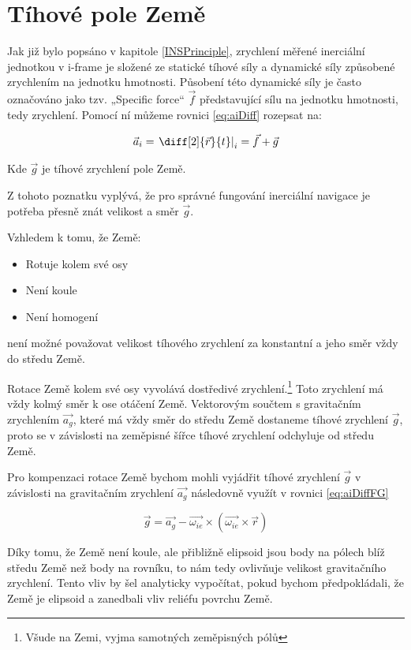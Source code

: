 \section{Tíhové pole Země}
Jak již bylo popsáno v kapitole \ref{INSPrinciple}, zrychlení měřené inerciální jednotkou v i-frame je složené ze statické tíhové síly a dynamické síly způsobené zrychlením na jednotku hmotnosti. Působení této dynamické síly je často označováno jako tzv. „Specific force“ $ \vec{f} $ představující sílu na jednotku hmotnosti, tedy zrychlení. Pomocí ní můžeme rovnici \ref{eq:aiDiff} rozepsat na: \cite{Tittertonc2004} \cite{Grewal2013}

\begin{equation} \label{eq:aiDiffFG}
\vec{a}_{i} = \left. \diff[2]{\vec{r}}{t} \right|_{i} = \vec{f} + \vec{g}
\end{equation}

Kde $ \vec{g} $ je tíhové zrychlení pole Země.

Z tohoto poznatku vyplývá, že pro správné fungování inerciální navigace je potřeba přesně znát velikost a směr $ \vec{g} $. 

Vzhledem k tomu, že Země: \cite{Halliday2000}
\begin{itemize}
\item Rotuje kolem své osy
\item Není koule
\item Není homogení
\end{itemize}
není možné považovat velikost tíhového zrychlení za konstantní a jeho směr vždy do středu Země.

Rotace Země kolem své osy vyvolává dostředivé zrychlení.\footnote{Všude na Zemi, vyjma samotných zeměpisných pólů}
Toto zrychlení má vždy kolmý směr k ose otáčení Země. Vektorovým součtem s gravitačním zrychlením $ \vec{a_{g}} $, které má vždy směr do středu Země dostaneme tíhové zrychlení $ \vec{g} $, proto se v závislosti na zeměpisné šířce tíhové zrychlení odchyluje od středu Země. \cite{Halliday2000}

Pro kompenzaci rotace Země bychom mohli vyjádřit tíhové zrychlení $ \vec{g} $ v závislosti na gravitačním zrychlení $ \vec{a_{g}} $ následovně využít v rovnici \ref{eq:aiDiffFG} \cite{Tittertonc2004}

\begin{equation} \label{eq:coriolis}
\vec{g}=\vec{a_{g}} - \vec{\omega_{ie}} \times (\vec{\omega_{ie}} \times \vec{r})
\end{equation}

Díky tomu, že Země není koule, ale přibližně elipsoid jsou body na pólech blíž středu Země než body na rovníku, to nám tedy ovlivňuje velikost gravitačního zrychlení. Tento vliv by šel analyticky vypočítat, pokud bychom předpokládali, že Země je elipsoid a zanedbali vliv reliéfu povrchu Země. \cite{Halliday2000}


